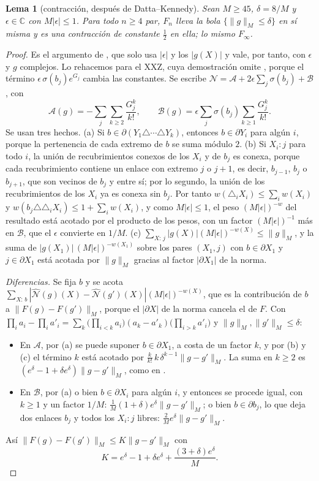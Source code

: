\documentclass[11pt,a4paper]{article}
\newtheorem{lema}[teorema]{Lema}
\theoremstyle{remark}
\begin{document}
\begin{lema}[contracción, después de Datta--Kennedy]\label{lem:dk}
Sean $M\ge45$, $\delta=8/M$ y $\epsilon\in\mathbb C$ con $M|\epsilon|\le1$. Para todo $n\ge4$ par,
$F_n$ lleva la bola $\{\|g\|_M\le\delta\}$ en sí misma y es una contracción de constante $\tfrac12$ en
ella; lo mismo $F_\infty$.
\end{lema}

\begin{proof}
Es el argumento de \cite[ecs.~(28)--(38)]{dk-kink}, que solo usa $|\epsilon|$ y los $|g(X)|$ y vale,
por tanto, con $\epsilon$ y $g$ complejos. Lo rehacemos para el XXZ, cuya demostración omite
\cite[Sec.~4]{dk-kink}, porque el término $\epsilon\,\sigma(b_j)e^{G_j}$ cambia las constantes. Se
escribe $\mathcal N=\mathcal A+2\epsilon\sum_j\sigma(b_j)+\mathcal B$, con
\[
  \mathcal A(g)=-\sum_j\sum_{k\ge2}\frac{G_j^k}{k!},\qquad
  \mathcal B(g)=\epsilon\sum_j\sigma(b_j)\sum_{k\ge1}\frac{G_j^k}{k!}.
\]
Se usan tres hechos.
(a) Si $b\in\partial(Y_1\triangle\cdots\triangle Y_k)$, entonces $b\in\partial Y_i$ para algún $i$, porque
la pertenencia de cada extremo de $b$ se suma módulo $2$.
(b) Si $X_i:j$ para todo $i$, la unión de recubrimientos conexos de los $X_i$ y de $b_j$ es conexa,
porque cada recubrimiento contiene un enlace con extremo $j$ o $j{+}1$, es decir, $b_{j-1}$, $b_j$ o
$b_{j+1}$, que son vecinos de $b_j$ y entre sí; por lo segundo, la unión de los recubrimientos de los
$X_i$ ya es conexa sin $b_j$. Por tanto $w(\triangle_iX_i)\le\sum_iw(X_i)$ y
$w(b_j\triangle\triangle_iX_i)\le1+\sum_iw(X_i)$, y como $M|\epsilon|\le1$, el peso
$(M|\epsilon|)^{-w}$ del resultado está acotado por el producto de los pesos, con un factor
$(M|\epsilon|)^{-1}$ más en $\mathcal B$, que el $\epsilon$ convierte en $1/M$.
(c) $\sum_{X:\,j}|g(X)|(M|\epsilon|)^{-w(X)}\le\|g\|_M$, y la suma de
$|g(X_1)|\,(M|\epsilon|)^{-w(X_1)}$ sobre los pares $(X_1,j)$ con $b\in\partial X_1$ y $j\in\partial X_1$
está acotada por $\|g\|_M$ gracias al factor $|\partial X_1|$ de la norma.

\emph{Diferencias.} Se fija $b$ y se acota
$\sum_{X:\,b}|\widehat{\mathcal N}(g)(X)-\widehat{\mathcal N}(g')(X)|(M|\epsilon|)^{-w(X)}$, que es la
contribución de $b$ a $\|F(g)-F(g')\|_M$, porque el $|\partial X|$ de la norma cancela el de $F$. Con
$\prod_ia_i-\prod_ia'_i=\sum_k\big(\prod_{i<k}a_i\big)(a_k-a'_k)\big(\prod_{i>k}a'_i\big)$ y
$\|g\|_M,\|g'\|_M\le\delta$:
\begin{itemize}
\item En $\mathcal A$, por (a) se puede suponer $b\in\partial X_1$, a costa de un factor $k$, y por
  (b) y (c) el término $k$ está acotado por $\frac k{k!}\,k\,\delta^{k-1}\|g-g'\|_M$. La suma en
  $k\ge2$ es $(e^\delta-1+\delta e^\delta)\|g-g'\|_M$, como en \cite[ec.~(36)]{dk-kink}.
\item En $\mathcal B$, por (a) o bien $b\in\partial X_i$ para algún $i$, y entonces se procede igual,
  con $k\ge1$ y un factor $1/M$: $\frac1M(1+\delta)e^\delta\|g-g'\|_M$; o bien $b\in\partial b_j$,
  lo que deja dos enlaces $b_j$ y todos los $X_i:j$ libres: $\frac2Me^\delta\|g-g'\|_M$.
\end{itemize}
Así $\|F(g)-F(g')\|_M\le K\|g-g'\|_M$ con
\[
  K=e^\delta-1+\delta e^\delta+\frac{(3+\delta)e^\delta}M .
\]


\end{proof}
\end{document}
